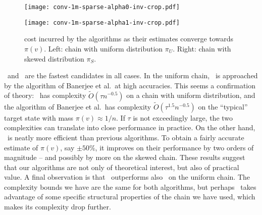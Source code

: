 \begin{figure}[h]
\begin{minipage}{0.49\textwidth}
\centering
\texttt{[image: conv-1m-sparse-alpha0-inv-crop.pdf]}
\end{minipage}
\begin{minipage}{0.02\textwidth}
\hspace{0.01\textwidth}
\end{minipage}
\begin{minipage}{0.49\textwidth}
\centering
\texttt{[image: conv-1m-sparse-alpha1-inv-crop.pdf]}
\end{minipage}
\caption{cost incurred by the algorithms as their estimates converge towards $\pi(v)$. Left: chain with uniform distribution $\pi_{U}$. Right: chain with skewed distribution $\pi_S$.}
\label{fig:1}
\end{figure}

\taupiest\ and \taunest\ are the fastest candidates in all cases.
In the uniform chain, \taupiest\ is approached by the algorithm of Banerjee et al.\ at high accuracies.
This seems a confirmation of theory: \taupiest\ has complexity $\tilde{O}(\tau n^{-0.5})$ on a chain with uniform distribution, and the algorithm of Banerjee et al.\ has complexity $\tilde{O}(\tau^{1.5} n^{-0.5})$ on the ``typical'' target state with mass $\pi(v) \approx 1/n$.
If $\tau$ is not exceedingly large, the two complexities can translate into close performance in practice.
On the other hand, \taunest\ is neatly more efficient than previous algorithms.
To obtain a fairly accurate estimate of $\pi(v)$, say $\pm 50 \%$, it improves on their performance by two orders of magnitude -- and possibly by more on the skewed chain.
These results suggest that our algorithms are not only of theoretical interest, but also of practical value.
A final observation is that \taunest\ outperforms also \taupiest\ on the uniform chain. The complexity bounds we have are the same for both algorithms, but perhaps \taunest\ takes advantage of some specific structural properties of the chain we have used, which makes its complexity drop further.


